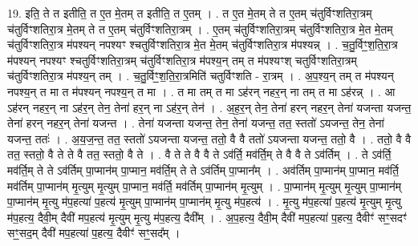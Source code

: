 \documentclass[17pt]{extarticle}
\begin{document}
19. इति॒ ते त इतीति॒ त ए॒त मे॒तम् त इतीति॒ त ए॒तम् । . त ए॒त मे॒तम् ते त ए॒तम् च॑तुर्विꣳशतिरा॒त्रम् च॑तुर्विꣳशतिरा॒त्र मे॒तम् ते त ए॒तम् च॑तुर्विꣳशतिरा॒त्रम् । . ए॒तम् च॑तुर्विꣳशतिरा॒त्रम् च॑तुर्विꣳशतिरा॒त्र मे॒त मे॒तम् च॑तुर्विꣳशतिरा॒त्र म॑पश्यन् नपश्यꣳ श्चतुर्विꣳशतिरा॒त्र मे॒त मे॒तम् च॑तुर्विꣳशतिरा॒त्र म॑पश्यन्न् । . च॒तु॒र्विꣳ॒॒श॒ति॒रा॒त्र म॑पश्यन् नपश्यꣳ श्चतुर्विꣳशतिरा॒त्रम् च॑तुर्विꣳशतिरा॒त्र म॑पश्य॒न् तम् त म॑पश्यꣳश् चतुर्विꣳशतिरा॒त्रम् च॑तुर्विꣳशतिरा॒त्र म॑पश्य॒न् तम् । . च॒तु॒र्विꣳ॒॒श॒ति॒रा॒त्रमिति॑ चतुर्विꣳशति - रा॒त्रम् । . अ॒प॒श्य॒न् तम् त म॑पश्यन् नपश्य॒न् त मा त म॑पश्यन् नपश्य॒न् त मा । . त मा तम् त मा ऽह॑रन् नहर॒न् ना तम् त मा ऽह॑रन्न् । . आ ऽह॑रन् नहर॒न् ना ऽह॑र॒न् तेन॒ तेना॑ हर॒न् ना ऽह॑र॒न् तेन॑ । . अ॒ह॒र॒न् तेन॒ तेना॑ हरन् नहर॒न् तेना॑ यजन्ता यजन्त॒ तेना॑ हरन् नहर॒न् तेना॑ यजन्त । . तेना॑ यजन्ता यजन्त॒ तेन॒ तेना॑ यजन्त॒ तत॒ स्ततो॑ ऽयजन्त॒ तेन॒ तेना॑ यजन्त॒ ततः॑ । . अ॒य॒ज॒न्त॒ तत॒ स्ततो॑ ऽयजन्ता यजन्त॒ ततो॒ वै वै ततो॑ ऽयजन्ता यजन्त॒ ततो॒ वै । . ततो॒ वै वै तत॒ स्ततो॒ वै ते ते वै तत॒ स्ततो॒ वै ते । . वै ते ते वै वै ते ऽव॑र्ति॒ मव॑र्ति॒म् ते वै वै ते ऽव॑र्तिम् । . ते ऽव॑र्ति॒ मव॑र्ति॒म् ते ते ऽव॑र्तिम् पा॒प्मान॑म् पा॒प्मान॒ मव॑र्ति॒म् ते ते ऽव॑र्तिम् पा॒प्मान᳚म् । . अव॑र्तिम् पा॒प्मान॑म् पा॒प्मान॒ मव॑र्ति॒ मव॑र्तिम् पा॒प्मान॑म् मृ॒त्युम् मृ॒त्युम् पा॒प्मान॒ मव॑र्ति॒ मव॑र्तिम् पा॒प्मान॑म् मृ॒त्युम् । . पा॒प्मान॑म् मृ॒त्युम् मृ॒त्युम् पा॒प्मान॑म् पा॒प्मान॑म् मृ॒त्यु म॑प॒हत्या॑ प॒हत्य॑ मृ॒त्युम् पा॒प्मान॑म् पा॒प्मान॑म् मृ॒त्यु म॑प॒हत्य॑ । . मृ॒त्यु म॑प॒हत्या॑ प॒हत्य॑ मृ॒त्युम् मृ॒त्यु म॑प॒हत्य॒ दैवी॒म् दैवी॑ मप॒हत्य॑ मृ॒त्युम् मृ॒त्यु म॑प॒हत्य॒ दैवी᳚म् । . अ॒प॒हत्य॒ दैवी॒म् दैवी॑ मप॒हत्या॑ प॒हत्य॒ दैवीꣳ॑ सꣳ॒॒सदꣳ॑ सꣳ॒॒सद॒म् दैवी॑ मप॒हत्या॑ प॒हत्य॒ दैवीꣳ॑ सꣳ॒॒सद᳚म् । \newline
\end{document}
